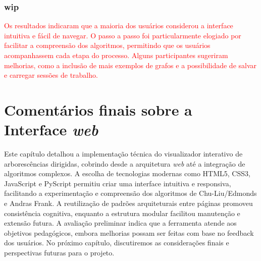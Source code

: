\subsubsection{wip}
\textcolor{red}{Os resultados indicaram que a maioria dos usuários considerou a interface intuitiva e fácil de navegar. O passo a passo foi particularmente elogiado por facilitar a compreensão dos algoritmos, permitindo que os usuários acompanhassem cada etapa do processo. Alguns participantes sugeriram melhorias, como a inclusão de mais exemplos de grafos e a possibilidade de salvar e carregar sessões de trabalho.}

\section{Comentários finais sobre a Interface \textit{web}}
Este capítulo detalhou a implementação técnica do visualizador interativo de arborescências dirigidas, cobrindo desde a arquitetura \textit{web} até a integração de algoritmos complexos. A escolha de tecnologias modernas como HTML5, CSS3, JavaScript e PyScript permitiu criar uma interface intuitiva e responsiva, facilitando a experimentação e compreensão dos algoritmos de Chu-Liu/Edmonds e Andras Frank. A reutilização de padrões arquiteturais entre páginas promoveu consistência cognitiva, enquanto a estrutura modular facilitou manutenção e extensão futura. A avaliação preliminar indica que a ferramenta atende aos objetivos pedagógicos, embora melhorias possam ser feitas com base no feedback dos usuários. No próximo capítulo, discutiremos as considerações finais e perspectivas futuras para o projeto.
